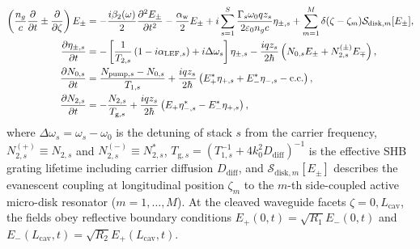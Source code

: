 \documentclass[11pt,letterpaper]{article}
\renewcommand{\hbar}{\mathchar'26\mkern-9mu h}
\begin{document}
\begin{subequations}
\label{eq:maxwell_bloch_full}
\begin{align}
\left(\frac{n_g}{c}\frac{\partial}{\partial t} \pm \frac{\partial}{\partial \zeta}\right) E_\pm &= -\frac{i\beta_2(\omega)}{2}\frac{\partial^2 E_\pm}{\partial t^2} - \frac{\alpha_{\mathrm{w}}}{2}E_\pm + i\sum_{s=1}^S \frac{\Gamma_s \omega_0 q z_s}{2\varepsilon_0 n_g c}\eta_{\pm,s} + \sum_{m=1}^M \delta(\zeta - \zeta_m)\mathcal{S}_{\mathrm{disk},m}[E_\pm], \label{eq:mb_field}\\
\frac{\partial \eta_{\pm,s}}{\partial t} &= -\left[ \frac{1}{T_{2,s}}\left(1 - i\alpha_{\mathrm{LEF},s}\right) + i\Delta\omega_s \right]\eta_{\pm,s} - \frac{i q z_s}{2\hbar}\left( N_{0,s} E_\pm + N_{2,s}^{(\pm)} E_\mp \right), \label{eq:mb_pol}\\
\frac{\partial N_{0,s}}{\partial t} &= \frac{N_{\mathrm{pump},s} - N_{0,s}}{T_{1,s}} + \frac{i q z_s}{2\hbar}\left( E_+^* \eta_{+,s} + E_-^* \eta_{-,s} - \mathrm{c.c.} \right), \label{eq:mb_n0}\\
\frac{\partial N_{2,s}}{\partial t} &= -\frac{N_{2,s}}{T_{\mathrm{g},s}} + \frac{i q z_s}{2\hbar}\left( E_+ \eta_{-,s}^* - E_-^* \eta_{+,s} \right), \label{eq:mb_n2}
\end{align}
\end{subequations}
where $\Delta\omega_s = \omega_s - \omega_0$ is the detuning of stack $s$ from the carrier frequency, $N_{2,s}^{(+)} \equiv N_{2,s}$ and $N_{2,s}^{(-)} \equiv N_{2,s}^*$, $T_{\mathrm{g},s} = (T_{1,s}^{-1} + 4 k_0^2 D_{\mathrm{diff}})^{-1}$ is the effective SHB grating lifetime including carrier diffusion $D_{\mathrm{diff}}$, and $\mathcal{S}_{\mathrm{disk},m}[E_\pm]$ describes the evanescent coupling at longitudinal position $\zeta_m$ to the $m$-th side-coupled active micro-disk resonator ($m = 1, \dots, M$). At the cleaved waveguide facets $\zeta = 0, L_{\mathrm{cav}}$, the fields obey reflective boundary conditions $E_+(0, t) = \sqrt{R_1} E_-(0, t)$ and $E_-(L_{\mathrm{cav}}, t) = \sqrt{R_2} E_+(L_{\mathrm{cav}}, t)$.
\end{document}
